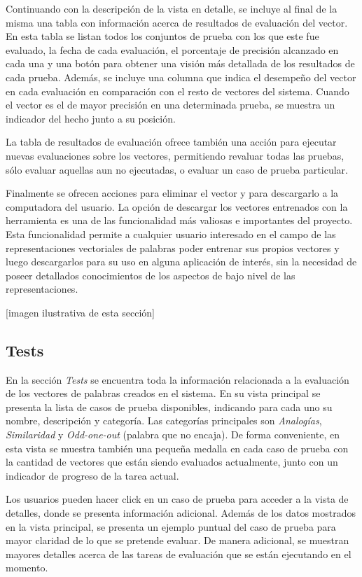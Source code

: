 Continuando con la descripción de la vista en detalle, se incluye al final de la misma una tabla con
información acerca de resultados de evaluación del vector. En esta tabla se listan todos los conjuntos de
prueba con los que este fue evaluado, la fecha de cada evaluación, el porcentaje de precisión alcanzado en
cada una y una botón para obtener una visión más detallada de los resultados de cada prueba. Además, se
incluye una columna que indica el desempeño del vector en cada evaluación en comparación con el resto de
vectores del sistema. Cuando el vector es el de mayor precisión en una determinada prueba, se muestra un
indicador del hecho junto a su posición.

La tabla de resultados de evaluación ofrece también una acción para ejecutar nuevas evaluaciones sobre los
vectores, permitiendo revaluar todas las pruebas, sólo evaluar aquellas aun no ejecutadas, o evaluar un
caso de prueba particular.

Finalmente se ofrecen acciones para eliminar el vector y para descargarlo a la computadora del usuario. La
opción de descargar los vectores entrenados con la herramienta es una de las funcionalidad más valiosas e
importantes del proyecto. Esta funcionalidad permite a cualquier usuario interesado en el campo de las
representaciones vectoriales de palabras poder entrenar sus propios vectores y luego descargarlos para su
uso en alguna aplicación de interés, sin la necesidad de poseer detallados conocimientos de los aspectos de
bajo nivel de las representaciones.

[imagen ilustrativa de esta sección]

\subsection{Tests}

En la sección \textit{Tests} se encuentra toda la información relacionada a la evaluación de los vectores
de palabras creados en el sistema. En su vista principal se presenta la lista de casos de prueba
disponibles, indicando para cada uno su nombre, descripción y categoría. Las categorías principales son
\textit{Analogías}, \textit{Similaridad} y \textit{Odd-one-out} (palabra que no encaja). De forma
conveniente, en esta vista se muestra también una pequeña medalla en cada caso de prueba con la cantidad
de vectores que están siendo evaluados actualmente, junto con un indicador de progreso de la tarea actual.

Los usuarios pueden hacer click en un caso de prueba para acceder a la vista de detalles, donde se
presenta información adicional. Además de los datos mostrados en la vista principal, se presenta un
ejemplo puntual del caso de prueba para mayor claridad de lo que se pretende evaluar. De manera adicional,
se muestran mayores detalles acerca de las tareas de evaluación que se están ejecutando en el momento.

